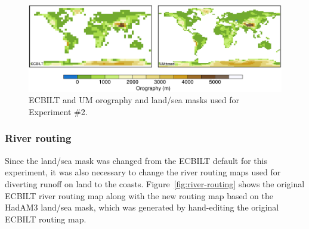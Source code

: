 \documentclass[a4paper,11pt]{article}
\begin{document}
\begin{figure}
  \begin{center}
    \includegraphics[width=\textwidth]{../expt-2/plots/orog-plots}
  \end{center}
  \caption{ECBILT and UM orography and land/sea masks used for
    Experiment \#2.}
  \label{fig:orog-2}
\end{figure}

\subsubsection{River routing}

Since the land/sea mask was changed from the ECBILT default for this
experiment, it was also necessary to change the river routing maps
used for diverting runoff on land to the coasts.
Figure~\ref{fig:river-routing} shows the original ECBILT river routing
map along with the new routing map based on the HadAM3 land/sea mask,
which was generated by hand-editing the original ECBILT routing map.
\end{document}
